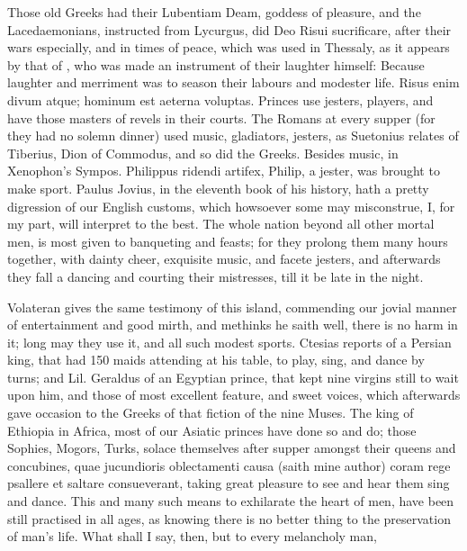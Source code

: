 {Those old Greeks had their Lubentiam Deam, goddess of pleasure,
and the Lacedaemonians, instructed from Lycurgus, did Deo Risui
sucrificare, after their wars especially, and in times of peace, which
was used in Thessaly, as it appears by that of \Apuleius, who was
made an instrument of their laughter himself: Because laughter
and merriment was to season their labours and modester life.
Risus enim divum atque; hominum est aeterna voluptas. Princes use
jesters, players, and have those masters of revels in their courts. The
Romans at every supper (for they had no solemn dinner) used music,
gladiators, jesters, \etc{} as Suetonius relates of Tiberius, Dion
of Commodus, and so did the Greeks. Besides music, in Xenophon's
Sympos. Philippus ridendi artifex, Philip, a jester, was brought to
make sport. Paulus Jovius, in the eleventh book of his history, hath a
pretty digression of our English customs, which howsoever some may
misconstrue, I, for my part, will interpret to the best. The
whole nation beyond all other mortal men, is most given to banqueting
and feasts; for they prolong them many hours together, with dainty
cheer, exquisite music, and facete jesters, and afterwards they fall a
dancing and courting their mistresses, till it be late in the night.

Volateran gives the same testimony of this island, commending our
jovial manner of entertainment and good mirth, and methinks he saith
well, there is no harm in it; long may they use it, and all such modest
sports. Ctesias reports of a Persian king, that had 150 maids attending
at his table, to play, sing, and dance by turns; and Lil.
Geraldus of an Egyptian prince, that kept nine virgins still to wait
upon him, and those of most excellent feature, and sweet voices, which
afterwards gave occasion to the Greeks of that fiction of the nine
Muses. The king of Ethiopia in Africa, most of our Asiatic princes have
done so and do; those Sophies, Mogors, Turks, \etc{} solace themselves
after supper amongst their queens and concubines, quae jucundioris
oblectamenti causa (saith mine author) coram rege psallere et
saltare consueverant, taking great pleasure to see and hear them sing
and dance. This and many such means to exhilarate the heart of men,
have been still practised in all ages, as knowing there is no better
thing to the preservation of man's life. What shall I say, then, but to
every melancholy man,

}
